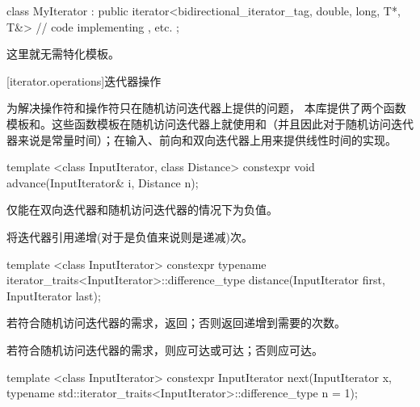\begin{codeblock}
class MyIterator :
  public iterator<bidirectional_iterator_tag, double, long, T*, T&> {
  // code implementing \tcode{++}, etc.
};
\end{codeblock}

\pnum
这里就无需特化模板。
\exitexample

[iterator.operations]{迭代器操作}

\pnum
为解决\tcode{+}操作符和\tcode{-}操作符只在随机访问迭代器上提供的问题， 本库提供了两个函数模板和。这些函数模板在随机访问迭代器上就使用\tcode{+}和\tcode{-}（并且因此对于随机访问迭代器来说是常量时间）；在输入、前向和双向迭代器上用\tcode{++}来提供线性时间的实现。

%
\begin{itemdecl}
template <class InputIterator, class Distance>
  constexpr void advance(InputIterator& i, Distance n);
\end{itemdecl}

\begin{itemdescr}
\pnum
\requires
{}仅能在双向迭代器和随机访问迭代器的情况下为负值。

\pnum
\effects
将迭代器引用递增(对于是负值来说则是递减)次。
\end{itemdescr}

%
\begin{itemdecl}
template <class InputIterator>
  constexpr typename iterator_traits<InputIterator>::difference_type
    distance(InputIterator first, InputIterator last);
\end{itemdecl}

\begin{itemdescr}
\pnum
\effects
若符合随机访问迭代器的需求，返回；否则返回递增到需要的次数。

\pnum
\requires
若符合随机访问迭代器的需求，则应可达或可达；否则应可达。
\end{itemdescr}

%
\begin{itemdecl}
template <class InputIterator>
  constexpr InputIterator next(InputIterator x,
    typename std::iterator_traits<InputIterator>::difference_type n = 1);
\end{itemdecl}

